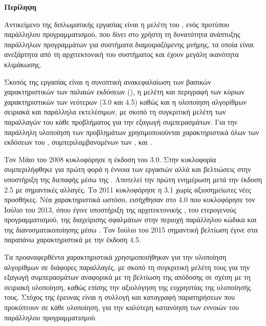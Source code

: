 
\clearpage
\begin{small}
\vfil
\end{small}



\clearpage
\begin{flushleft}
{\large \textbf{Περίληψη}}\\[0.5 cm]
\end{flushleft}
Αντικείμενο της διπλωματικής εργασίας είναι η μελέτη του , ενός προτύπου
παράλληλου προγραμματισμού, που δίνει στο χρήστη τη δυνατότητα ανάπτυξης παράλληλων προγραμμάτων για
συστήματα διαμοιραζόμενης μνήμης, τα οποία  είναι ανεξάρτητα από τη αρχιτεκτονική του συστήματος και
έχουν μεγάλη ικανότητα κλιμάκωσης\cite{pdplab}.

Σκοπός της εργασίας είναι η συνοπτική ανακεφαλαίωση των βασικών χαρακτηριστικών των παλαιών εκδόσεων
(\en{OpenMP 2.5}), η μελέτη και περιγραφή των κύριων χαρακτηριστικών των νεότερων (3.0 και 4.5)
καθώς και η υλοποίηση αλγορίθμων σειριακά και παράλληλα εκτελέσιμων, με σκοπό τη συγκριτική μελέτη
των παραλλαγών του κάθε προβλήματος για την εξαγωγή συμπερασμάτων. Για την παράλληλη υλοποίηση των προβλημάτων χρησιμοποιούνται χαρακτηριστικά όλων των εκδόσεων του , συμπεριλαμβανομένων των ,  και \cite{thenextstep59}.

Τον Μάιο του 2008 κυκλοφόρησε η έκδοση του  3.0. Στην κυκλοφορία συμπεριλήφθηκε για
πρώτη φορά η έννοια των εργασιών\en{(Tasking)} αλλά και βελτιώσεις στην υποστήριξη της διεπαφής
μέσω της \en{C++}. Αποτελεί την πρώτη ενημέρωση μετά την έκδοση 2.5 με σημαντικές αλλαγές. Το
2011 κυκλοφόρησε η  3.1 χωρίς αξιοσημείωτες νέες προσθήκες. Νέα χαρακτηριστικά ωστόσο,
εισήχθησαν στο \en{OpenMP} 4.0 που κυκλοφόρησε τον Ιούλιο του 2013, όπου έγινε υποστήριξη της
αρχιτεκτονικής \en{cc-NUMA}, του ετερογενούς προγραμματισμού, της διαχείρισης σφαλμάτων στην περιοχή
παράλληλου κώδικα και της διανυσματικοποίησης μέσω \en{SIMD}. Τον Ιούλιο του 2015 σημαντική βελτίωση
έγινε στα παραπάνω χαρακτηριστικά με την έκδοση \en{OpenMP} 4.5\cite{thenextstep20}.

Τα προαναφερθέντα χαρακτηριστικά χρησιμοποιήθηκαν για την υλοποίηση αλγορίθμων σε διάφορες
παραλλαγές, με σκοπό τη συγκριτική μελέτη τους για την εξαγωγή 
συμπερασμάτων αναφορικά με τη
βελτίωση της απόδοσης σε σχέση με τη σειριακή υλοποίηση, καθώς επίσης την
αξιολόγηση της ευχρηστίας της υλοποίησής τους. Στόχος της έρευνας είναι η συλλογή και καταγραφή
παρατηρήσεων που προκύπτουν σε κάθε υλοποίηση, για την καλύτερη κατανόηση των εννοιών του παράλληλου
προγραμματισμού.

